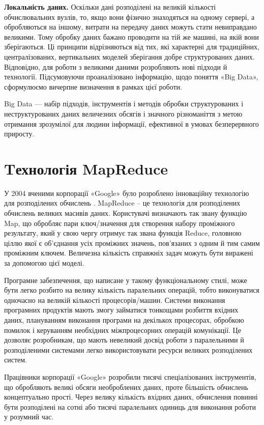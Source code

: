 \textbf{Локальність даних.}
Оскільки дані розподілені на великій кількості обчислювальних вузлів,
то, якщо вони фізично знаходяться на одному сервері,
а обробляються на іншому, витрати на передачу даних можуть стати невиправдано великими.
Тому обробку даних бажано проводити на тій же машині, на якій вони зберігаються.
Ці принципи відрізняються від тих, які характерні для традиційних, централізованих, вертикальних моделей зберігання добре структурованих даних. Відповідно, для роботи з великими даними розробляють нові підходи й технології.
Підсумовуючи проаналізовано інформацію,
щодо поняття «Big Data», сформулюємо вичерпне визначення в рамках цієї роботи.

Big Data — набір підходів, інструментів і методів обробки структурованих і неструктурованих даних величезних обсягів і значного різноманіття з метою отримання зрозумілої для людини інформації, ефективної в умовах безперервного приросту.

\section{Tехнологія MapReduce}

У 2004 вченими корпорації «Google» було розроблено інноваційну технологію для розподілених обчислень \cite{GoogleMapReduce}.
MapReduce – це технологія для розподілених обчислень великих масивів даних.
Користувачі визначають так звану функцію Map, що обробляє
пари ключ/значення для створення набору проміжного результату, який у свою чергу отримує
так звана функція Reduce, головною ціллю якої є об'єднання усіх проміжних значень, пов'язаних з одним й тим самим проміжним ключем.
Величезна кількість справжніх задач можуть бути виражені за допомогою цієї моделі.

Програмне забезпечення, що написане у такому функціональному стилі,
може бути легко розбито на велику кількість паралельних операцій, тобто виконуватися одночасно на
великій кількості процесорів/машин.
Системи виконання програмних продуктів мають змогу займатися
тонкощами розбиття вхідних даних, плануванням виконання програми на декількох процесорах,
обробкою помилок і керуванням необхідних міжпроцесорних операцій комунікації.
Це дозволяє розробникам, що мають невеликий досвід роботи з паралельними
й розподіленими системами легко використовувати ресурси великих розподілених систем.

Працівники корпорації «Google» розробили тисячі спеціалізованих
інструментів, що обробляють великі обсяги необроблених даних,
проте більшість обчислень концептуально прості.
Через велику кількість вхідних даних, обчислення повинні бути розподілені на
сотні або тисячі паралельних одиниць для виконання роботи у розумний час.

